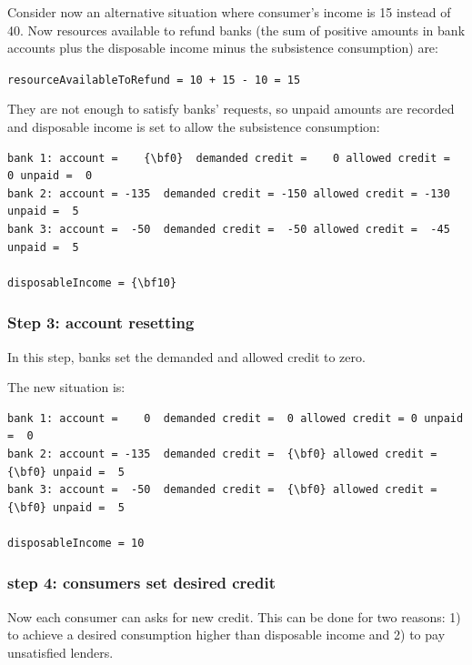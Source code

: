 \documentclass{article}
\begin{document}

Consider now an alternative situation where consumer's income is 15 instead of 40. Now resources available to refund banks (the sum of positive amounts in bank accounts plus the disposable income minus the subsistence consumption) are:

\verb/resourceAvailableToRefund = 10 + 15 - 10 = 15/

They are not enough to satisfy banks' requests, so unpaid amounts are recorded and disposable income is set to allow the subsistence consumption:

\begin{Verbatim}[commandchars=\\\{\}]
bank 1: account =    {\bf0}  demanded credit =    0 allowed credit =    0 unpaid =  0
bank 2: account = -135  demanded credit = -150 allowed credit = -130 unpaid =  5
bank 3: account =  -50  demanded credit =  -50 allowed credit =  -45 unpaid =  5

disposableIncome = {\bf10}
\end{Verbatim}

\subsubsection*{Step 3: account resetting}
In this step, banks set the demanded and allowed credit to zero.

The new situation is:

\begin{Verbatim}[commandchars=\\\{\}]
bank 1: account =    0  demanded credit =  0 allowed credit = 0 unpaid =  0
bank 2: account = -135  demanded credit =  {\bf0} allowed credit = {\bf0} unpaid =  5
bank 3: account =  -50  demanded credit =  {\bf0} allowed credit = {\bf0} unpaid =  5

disposableIncome = 10
\end{Verbatim}




\subsubsection*{step 4: consumers set desired credit}
Now each consumer can asks for new credit. This can be done for two reasons: 1) to achieve a desired consumption higher than disposable income and 2) to pay unsatisfied lenders.
\end{document}
